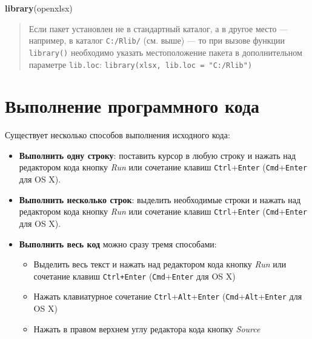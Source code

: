 \documentclass[]{book}
\newenvironment{Shaded}{\begin{snugshade}}{\end{snugshade}}
\newcommand{\KeywordTok}[1]{\textcolor[rgb]{0.13,0.29,0.53}{\textbf{#1}}}
\newcommand{\NormalTok}[1]{#1}
\providecommand{\tightlist}{%
  \setlength{\itemsep}{0pt}\setlength{\parskip}{0pt}}
\begin{document}
\begin{Shaded}
\begin{Highlighting}[]
\KeywordTok{library}\NormalTok{(openxlsx)}
\end{Highlighting}
\end{Shaded}

\begin{quote}
Если пакет установлен не в стандартный каталог, а в другое место ---
например, в каталог \texttt{С:/Rlib/} (см. выше) --- то при вызове
функции \texttt{library()} необходимо указать местоположение пакета в
дополнительном параметре \texttt{lib.loc}:
\texttt{library(xlsx,\ lib.loc\ =\ "C:/Rlib")}
\end{quote}

\section*{Выполнение программного кода}\label{--}

Существует несколько способов выполнения исходного кода:

\begin{itemize}
\tightlist
\item
  \textbf{Выполнить одну строку}: поставить курсор в любую строку и
  нажать над редактором кода кнопку \emph{Run} или сочетание клавиш
  \texttt{Ctrl}+\texttt{Enter} (\texttt{Cmd}+\texttt{Enter} для OS X).
\item
  \textbf{Выполнить несколько строк}: выделить необходимые строки и
  нажать над редактором кода кнопку \emph{Run} или сочетание клавиш
  \texttt{Ctrl}+\texttt{Enter} (\texttt{Cmd}+\texttt{Enter} для OS X).
\item
  \textbf{Выполнить весь код} можно сразу тремя способами:

  \begin{itemize}
  \tightlist
  \item
    Выделить весь текст и нажать над редактором кода кнопку \emph{Run}
    или сочетание клавиш \texttt{Ctrl+Enter}
    (\texttt{Cmd}+\texttt{Enter} для OS X)
  \item
    Нажать клавиатурное сочетание
    \texttt{Ctrl}+\texttt{Alt}+\texttt{Enter}
    (\texttt{Cmd}+\texttt{Alt}+\texttt{Enter} для OS X)
  \item
    Нажать в правом верхнем углу редактора кода кнопку \emph{Source}
  \end{itemize}
\end{itemize}
\end{document}
